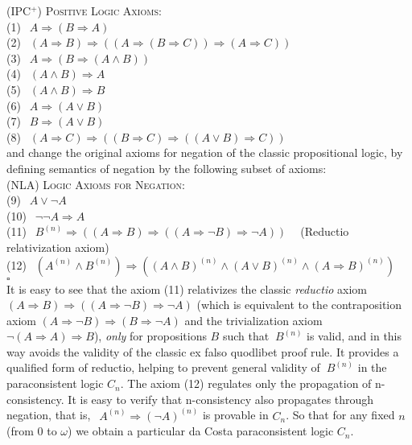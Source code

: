 \documentclass{llncs}
\begin{document}
\textsc{(IPC$^+$) Positive  Logic Axioms:}\\
 (1) $~~A\Rightarrow (B \Rightarrow A)$\\
 (2)  $~~(A \Rightarrow B) \Rightarrow ((A \Rightarrow (B\Rightarrow  C)) \Rightarrow (A \Rightarrow C))$\\
 (3)  $~~A \Rightarrow (B \Rightarrow (A \wedge B))  $\\
 (4)  $~~(A \wedge B) \Rightarrow A  $\\
 (5)  $~~(A \wedge B) \Rightarrow B  $\\
 (6)  $~~A \Rightarrow (A \vee B)  $\\
 (7)  $~~B \Rightarrow (A \vee B)  $\\
 (8)  $~~(A \Rightarrow C) \Rightarrow ((B \Rightarrow C) \Rightarrow((A \vee B) \Rightarrow C))
 $\\
 and change the original axioms for negation of the classic
 propositional logic, by defining semantics of negation by the
 following subset of axioms:\\
\textsc{(NLA)  Logic Axioms for Negation:}\\
(9) $~~A \vee \neg A$\\
(10) $~~\neg \neg A \Rightarrow A$\\
  (11) $~~B^{(n)} \Rightarrow ((A \Rightarrow B) \Rightarrow (( A \Rightarrow \neg B) \Rightarrow \neg A))~~~~$
(Reductio relativization axiom)\\
 (12) $~~(A^{(n)} \wedge B^{(n)}) \Rightarrow ((A \wedge B)^{(n)} \wedge (A \vee B)^{(n)} \wedge (A \Rightarrow B)^{(n)})$
 \\ $\square$\\
 It is easy to see that the axiom (11) relativizes the classic \emph{reductio} axiom $(A \Rightarrow B) \Rightarrow (( A \Rightarrow \neg B) \Rightarrow \neg
 A)$ (which is equivalent to the contraposition axiom $(A \Rightarrow \neg B) \Rightarrow (B \Rightarrow \neg A)$ and the trivialization
 axiom $\neg(A \Rightarrow A) \Rightarrow B$), \emph{only} for propositions $B$ such
 that $~B^{(n)}$ is valid, and in this way avoids the validity of the
 classic ex falso quodlibet proof rule.  It provides a qualified form of reductio, helping to prevent general validity  of $~B^{(n)}$
 in the paraconsistent logic $C_n$. The axiom (12) regulates
 only the propagation of n-consistency. It is easy to verify that
 n-consistency also propagates through negation, that is, $~~A^{(n)}  \Rightarrow (\neg A
 )^{(n)}$ is provable in $C_n$. So that for any fixed $n$ (from $0$ to $\omega$) we
 obtain a particular da Costa paraconsistent logic $C_n$. \\
\end{document}
